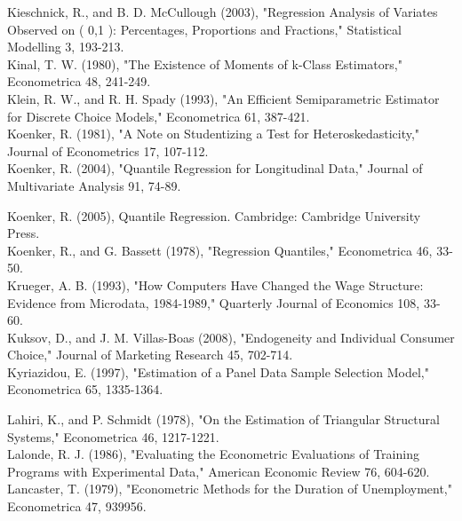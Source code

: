 \documentclass[10pt]{article}
\begin{document}
Kieschnick, R., and B. D. McCullough (2003), "Regression Analysis of Variates Observed on ( 0,1 ): Percentages, Proportions and Fractions," Statistical Modelling 3, 193-213.\\
Kinal, T. W. (1980), "The Existence of Moments of k-Class Estimators," Econometrica 48, 241-249.\\
Klein, R. W., and R. H. Spady (1993), "An Efficient Semiparametric Estimator for Discrete Choice Models," Econometrica 61, 387-421.\\
Koenker, R. (1981), "A Note on Studentizing a Test for Heteroskedasticity," Journal of Econometrics 17, 107-112.\\
Koenker, R. (2004), "Quantile Regression for Longitudinal Data," Journal of Multivariate Analysis 91, 74-89.

Koenker, R. (2005), Quantile Regression. Cambridge: Cambridge University Press.\\
Koenker, R., and G. Bassett (1978), "Regression Quantiles," Econometrica 46, 33-50.\\
Krueger, A. B. (1993), "How Computers Have Changed the Wage Structure: Evidence from Microdata, 1984-1989," Quarterly Journal of Economics 108, 33-60.\\
Kuksov, D., and J. M. Villas-Boas (2008), "Endogeneity and Individual Consumer Choice," Journal of Marketing Research 45, 702-714.\\
Kyriazidou, E. (1997), "Estimation of a Panel Data Sample Selection Model," Econometrica 65, 1335-1364.

Lahiri, K., and P. Schmidt (1978), "On the Estimation of Triangular Structural Systems," Econometrica 46, 1217-1221.\\
Lalonde, R. J. (1986), "Evaluating the Econometric Evaluations of Training Programs with Experimental Data," American Economic Review 76, 604-620.\\
Lancaster, T. (1979), "Econometric Methods for the Duration of Unemployment," Econometrica 47, 939956.
\end{document}
